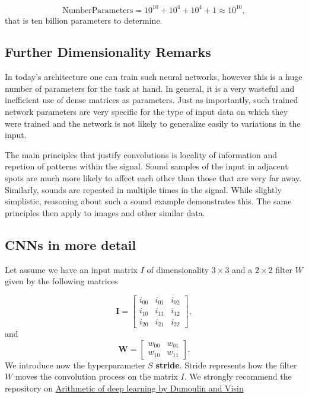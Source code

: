 \documentclass[%
oneside,                 %
final,                   %
10pt]{article}
\begin{document}
\[
\mathrm{NumberParameters}=10^{10}+10^4+10^4+1 \approx 10^{10},
\]
that is ten billion parameters to determine. 

\subsection{Further Dimensionality Remarks}

In today’s architecture one can train such neural networks, however
this is a huge number of parameters for the task at hand. In general,
it is a very wasteful and inefficient use of dense matrices as
parameters. Just as importantly, such trained network parameters are
very specific for the type of input data on which they were trained
and the network is not likely to generalize easily to variations in
the input.

The main principles that justify convolutions is locality of
information and repetion of patterns within the signal. Sound samples
of the input in adjacent spots are much more likely to affect each
other than those that are very far away. Similarly, sounds are
repeated in multiple times in the signal. While slightly simplistic,
reasoning about such a sound example demonstrates this. The same
principles then apply to images and other similar data.

\subsection{CNNs in more detail}

Let assume we have an input matrix $I$ of dimensionality $3\times 3$
and a $2\times 2$ filter $W$ given by the following matrices

\[
\bm{I}=\begin{bmatrix}i_{00} & i_{01} & i_{02}  \\
                      i_{10} & i_{11} & i_{12}  \\
	              i_{20} & i_{21} & i_{22} \end{bmatrix},
\]
and 
\[
\bm{W}=\begin{bmatrix}w_{00} & w_{01} \\
	              w_{10} & w_{11}\end{bmatrix}.
\]
We introduce now the hyperparameter $S$ \textbf{stride}. Stride represents how the filter $W$ moves the convolution process on the matrix $I$.
We strongly recommend the repository on \href{{https://github.com/vdumoulin/conv_arithmetic}}{Arithmetic of deep learning by Dumoulin and Visin} 
\end{document}
